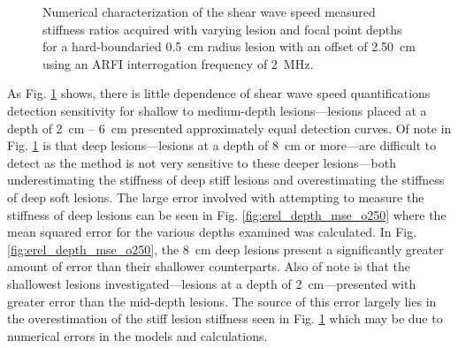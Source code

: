 			\begin{figure}[!htb]
				\centering
				\caption[Numerical characterization of shear wave speed measured stiffness ratio with changing lesion depth]{Numerical characterization of the shear wave speed measured stiffness ratios acquired with varying lesion and focal point depths for a hard-boundaried \SI{0.5}{cm} radius lesion with an offset of \SI{2.50}{\cm} using an ARFI interrogation frequency of \SI{2}{\MHz}.}
				\label{fig:erel_depth_o250}
			\end{figure}

			As Fig. \ref{fig:erel_depth_o250} shows, there is little dependence of shear wave speed quantifications detection sensitivity for shallow to medium-depth lesions---lesions placed at a depth of \SI{2}{\cm} -- \SI{6}{\cm} presented approximately equal detection curves. Of note in Fig. \ref{fig:erel_depth_o250} is that deep lesions---lesions at a depth of \SI{8}{\cm} or more---are difficult to detect as the method is not very sensitive to these deeper lesions---both underestimating the stiffness of deep stiff lesions and overestimating the stiffness of deep soft lesions. The large error involved with attempting to measure the stiffness of deep lesions can be seen in Fig. \ref{fig:erel_depth_mse_o250} where the mean squared error for the various depths examined was calculated. In Fig. \ref{fig:erel_depth_mse_o250}, the \SI{8}{\cm} deep lesions present a significantly greater amount of error than their shallower counterparts. Also of note is that the shallowest lesions investigated---lesions at a depth of \SI{2}{\cm}---presented with greater error than the mid-depth lesions. The source of this error largely lies in the overestimation of the stiff lesion stiffness seen in Fig. \ref{fig:erel_depth_o250} which may be due to numerical errors in the models and calculations.

